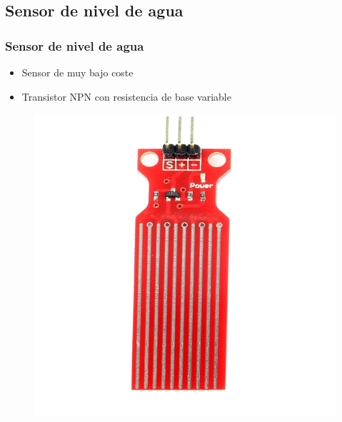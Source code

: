 \documentclass[compress]{beamer}
\begin{document}
	\subsection{Sensor de nivel de agua}
		\begin{frame}
			\frametitle{Sensor de nivel de agua}
				\begin{itemize}
					\item
					{

						Sensor de muy bajo coste

					}
					\item
					{

						Transistor NPN con resistencia de base variable

					}
				\end{itemize}
				\begin{figure}
					\includegraphics[keepaspectratio = true, totalheight=0.5\textheight]{figuras/sensor.jpg}

\end{figure}
\end{frame}
\end{document}
